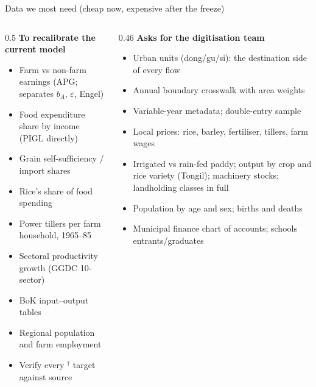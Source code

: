 \documentclass[10pt,aspectratio=169]{beamer}
\newcommand{\hl}[1]{\textcolor{mOrange}{#1}}
\newcommand{\unv}{$^{\dagger}$}
\begin{document}
\begin{frame}{Data we most need (cheap now, expensive after the freeze)}
  \begin{columns}[T]
    \begin{column}{0.5\textwidth}
      \textbf{To recalibrate the current model}
      \begin{itemize}\footnotesize
        \item Farm vs non-farm earnings (APG; separates $b_A$, $\varepsilon$, Engel)
        \item Food expenditure share by income (PIGL directly)
        \item Grain self-sufficiency / import shares
        \item Rice's share of food spending
        \item Power tillers per farm household, 1965--85
        \item Sectoral productivity growth (GGDC 10-sector)
        \item BoK input--output tables
        \item Regional population and farm employment
        \item Verify every \unv{} target against source
      \end{itemize}
    \end{column}
    \begin{column}{0.46\textwidth}
      \textbf{Asks for the digitisation team}
      \begin{itemize}\footnotesize
        \item Urban units (dong/gu/si): the destination side of every flow
        \item Annual boundary crosswalk with area weights
        \item Variable-year metadata; double-entry sample
        \item Local prices: rice, barley, fertiliser, tillers, farm wages
        \item Irrigated vs rain-fed paddy; output by crop and \hl{rice variety} (Tongil);
              machinery stocks; landholding classes in full
        \item Population by age and sex; births and deaths
        \item Municipal finance chart of accounts; schools entrants/graduates
      \end{itemize}
    \end{column}
  \end{columns}
\end{frame}
\end{document}
